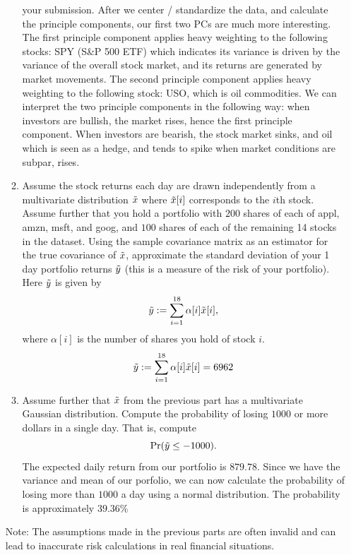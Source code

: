 \documentclass[12pt,twoside]{article}
\newcommand{\ry}{\rnd{ y}  }
\newcommand{\rx}{\rnd{ x}  }
\newcommand{\rnd}{\Tilde}
\begin{document}
\begin{enumerate}
\begin{enumerate}
    your submission.
    \subitem
    After we center / standardize the data, and calculate the principle components, our first two PCs are much more interesting. The first principle component applies heavy weighting to the following stocks: SPY (S\&P 500 ETF) which indicates its variance is driven by the variance of the overall stock market, and its returns are generated by market movements.
    The second principle component applies heavy weighting to the following stock: USO, which is oil commodities. We can interpret the two principle components in the following way: when investors are bullish, the market rises, hence the first principle component. When investors are bearish, the stock market sinks, and oil which is seen as a hedge, and tends to spike when market conditions are subpar, rises.
  \item Assume the stock returns each day are drawn independently from a
    multivariate distribution $\rx$ where
    $\rx[i]$ corresponds to the $i$th stock.  Assume further that
    you hold a portfolio with $200$ shares of each of appl, amzn, msft, and
    goog, and $100$ shares of each of the remaining 14 stocks in the
    dataset.  Using the sample covariance matrix as an estimator for
    the true covariance of $\rx$, approximate the standard deviation of
    your 1 day portfolio returns $\ry$ (this is a measure of the risk of your
    portfolio).  Here $\ry$ is given by
    $$\ry := \sum_{i=1}^{18} \alpha[i] \rx[i],$$
    where $\alpha[i]$ is the number of shares you hold of stock $i$.  
    \subitem $$\ry := \sum_{i=1}^{18} \alpha[i] \rx[i] = 6962$$
    
  \item Assume further that $\rx$ from the previous part has a
    multivariate Gaussian distribution.  Compute the probability
    of losing $1000$ or more dollars in a single day.  That is,
    compute
    $$\Pr(\ry \leq -1000).$$
    \subitem 
    The expected daily return from our portfolio is $879.78$. Since we have the variance and mean of our porfolio, we can now calculate the probability of losing more than $1000$ a day using a normal distribution. The probability is approximately $39.36\%$
  \end{enumerate}
  Note: The assumptions made in the previous parts are often
  invalid and can lead to inaccurate risk calculations in real
  financial situations. 


\end{enumerate}
\end{document}
